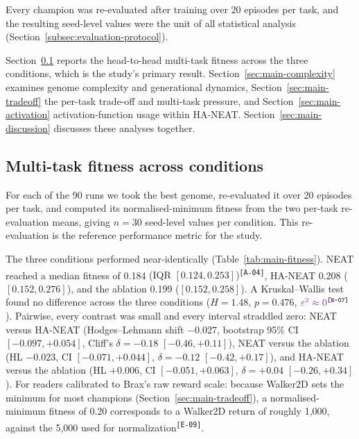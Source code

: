 \documentclass[12pt]{article}
\newcommand{\revID}[1]{\textsuperscript{\scriptsize\texttt{[#1]}}}
\newcommand{\revBrit}[2]{\textcolor{lrBlue}{#2}\revID{#1}}      %
\newcommand{\revNota}[2]{\textcolor{lrViolet}{#2}\revID{#1}}    %
\newcommand{\revAcro}[2]{\textcolor{lrPurple}{#2}\revID{#1}}    %
\begin{document}
Every champion was re-evaluated after training over 20 episodes per task, and the resulting seed-level values were the unit of all statistical analysis (Section~\ref{subsec:evaluation-protocol}).

Section~\ref{sec:main-study} reports the head-to-head multi-task fitness across the three conditions, which is the study's primary result.
Section~\ref{sec:main-complexity} examines genome complexity and generational dynamics, Section~\ref{sec:main-tradeoff} the per-task trade-off and multi-task pressure, and Section~\ref{sec:main-activation} activation-function usage within HA-NEAT.
Section~\ref{sec:main-discussion} discusses these analyses together.

\subsection{Multi-task fitness across conditions}
\label{sec:main-study}
For each of the 90 runs we took the best genome, re-evaluated it over 20 episodes per task, and computed its normalised-minimum fitness from the two per-task re-evaluation means, giving $n = 30$ seed-level values per condition.
This re-evaluation is the reference performance metric for the study.

The three conditions performed near-identically (Table~\ref{tab:main-fitness}).
NEAT reached a median fitness of 0.184 \revAcro{A-04}{(IQR $[0.124, 0.253]$)}, HA-NEAT 0.208 ($[0.152, 0.276]$), and the ablation 0.199 ($[0.152, 0.258]$).
A Kruskal--Wallis test found no difference across the three conditions ($H = 1.48$, $p = 0.476$, $\revNota{N-07}{\varepsilon^2 \approx 0}$).
Pairwise, every contrast was small and every interval straddled zero: NEAT versus HA-NEAT (Hodges--Lehmann shift $-0.027$, bootstrap 95\% CI $[-0.097, +0.054]$, Cliff's $\delta = -0.18$ $[-0.46, +0.11]$), NEAT versus the ablation (HL $-0.023$, CI $[-0.071, +0.044]$, $\delta = -0.12$ $[-0.42, +0.17]$), and HA-NEAT versus the ablation (HL $+0.006$, CI $[-0.051, +0.063]$, $\delta = +0.04$ $[-0.26, +0.34]$).
For readers calibrated to Brax's raw reward scale: because Walker2D sets the minimum for most champions (Section~\ref{sec:main-tradeoff}), a normalised-minimum fitness of 0.20 corresponds to a Walker2D return of roughly 1{,}000, against the 5{,}000 \revBrit{E-09}{used for normalization}.
\end{document}
